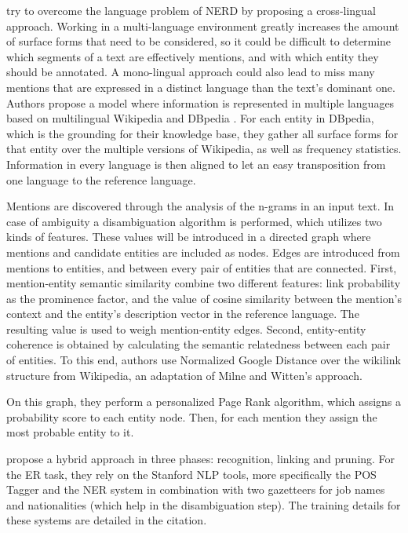 \cite{zhang2014} try to overcome the language problem of NERD by proposing a cross-lingual approach. Working in a multi-language environment greatly increases the amount of surface forms that need to be considered, so it could be difficult to determine which segments of a text are effectively mentions, and with which entity they should be annotated. A mono-lingual approach could also lead to miss many mentions that are expressed in a distinct language than the text's dominant one. Authors propose a model where information is represented in multiple languages based on multilingual Wikipedia and DBpedia \cite{zhang2014xlid}. For each entity in DBpedia, which is the grounding for their knowledge base, they gather all surface forms for that entity over the multiple versions of Wikipedia, as well as frequency statistics. Information in every language is then aligned to let an easy transposition from one language to the reference language.

Mentions are discovered through the analysis of the n-grams in an input text. In case of ambiguity a disambiguation algorithm is performed, which utilizes two kinds of features. These values will be introduced in a directed graph where mentions and candidate entities are included as nodes. Edges are introduced from mentions to entities, and between every pair of entities that are connected. First, mention-entity semantic similarity combine two different features: link probability as the prominence factor, and the value of cosine similarity between the mention's context and the entity's description vector in the reference language. The resulting value is used to weigh mention-entity edges. Second, entity-entity coherence is obtained by calculating the semantic relatedness between each pair of entities. To this end, authors use Normalized Google Distance over the wikilink structure from Wikipedia, an adaptation of Milne and Witten's approach.

On this graph, they perform a personalized Page Rank algorithm, which assigns a probability score to each entity node. Then, for each mention they assign the most probable entity to it.

\medskip

\cite{plu2015hybrid,plu2015revealing} propose a hybrid approach in three phases: recognition, linking and pruning. For the ER task, they rely on the Stanford NLP tools, more specifically the POS Tagger and the NER system in combination with two gazetteers for job names and nationalities (which help in the disambiguation step). The training details for these systems are detailed in the citation.


